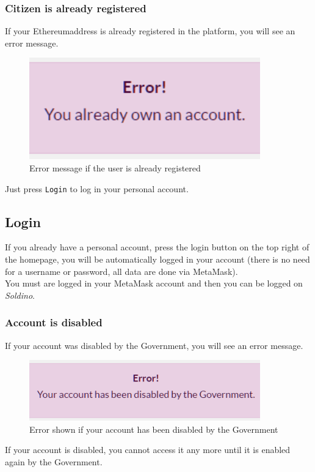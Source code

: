 		\subsubsection{Citizen is already registered}
		If your Ethereum\glosp address is already registered in the platform, you will 
		see an error message.
		\begin{figure}[H]
			\includegraphics[width=10cm]{res/images/user_already_registered.png}
			\centering
			\caption{Error message if the user is already registered}
		\end{figure}
		\noindent Just press \texttt{Login} to log in your personal account.
	\subsection{Login}
	If you already have a personal account, press the login button on the 
	top right of the homepage, you will be automatically logged in your account 
	(there is no need for a username or password, all data are done via MetaMask). 
	\\You must are logged in your MetaMask\glo{} account and then you can be logged on \textit{Soldino}.
		\subsubsection{Account is disabled}
		If your account was disabled by the Government, you will see an error 
		message.
		\begin{figure}[H]
			\includegraphics[width=10cm]{res/images/user_disabled.png}
			\centering
			\caption{Error shown if your account has been disabled by the Government}
		\end{figure}
	\noindent If your account is disabled, you cannot access it any more until it 
	is enabled again by the Government.
